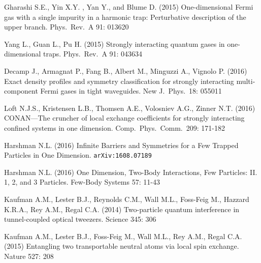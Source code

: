 \begin{thebibliography}{3}
 Gharashi S.E., Yin X.Y. , Yan Y., and Blume D. (2015) One-dimensional Fermi gas with a single impurity in a harmonic trap: Perturbative description of the upper branch. Phys.\ Rev.\ A 91: 013620 

 Yang L., Guan L., Pu H. (2015) Strongly interacting quantum gases in one-dimensional traps. Phys.\ Rev.\ A 91: 043634 


 Decamp J., Armagnat P., Fang B., Albert M., Minguzzi A., Vignolo P. (2016) Exact density profiles and symmetry classification for strongly interacting multi-component Fermi gases in tight waveguides. New J.\ Phys.\ 18: 055011

 Loft N.J.S., Kristensen L.B., Thomsen A.E., Volosniev A.G., Zinner N.T. (2016) CONAN—The cruncher of local exchange coefficients for strongly interacting confined systems in one dimension. Comp.\ Phys.\ Comm.\ 209: 171-182

 Harshman N.L. (2016) Infinite Barriers and Symmetries for a Few Trapped Particles in One Dimension. \texttt{arXiv:1608.07189}

 Harshman N.L. (2016) One Dimension, Two-Body Interactions, Few Particles: II. 1, 2, and 3 Particles. Few-Body Systems 57: 11-43

 Kaufman A.M., Lester B.J., Reynolds C.M., Wall M.L., Foss-Feig M., Hazzard K.R.A., Rey A.M., Regal C.A. (2014) Two-particle quantum interference in tunnel-coupled optical tweezers. Science 345: 306

 Kaufman A.M., Lester B.J., Foss-Feig M., Wall M.L., Rey A.M., Regal C.A. (2015) Entangling two transportable neutral atoms via local spin exchange. Nature 527: 208


\end{thebibliography}








